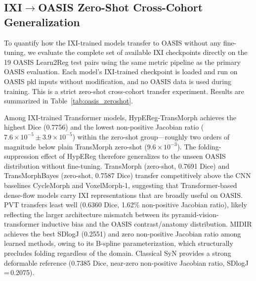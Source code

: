\documentclass[jimaging,article,submit,pdftex,moreauthors]{Definitions/mdpi}
\begin{document}
\subsection{IXI\texorpdfstring{\(\to\)}{→}OASIS Zero-Shot Cross-Cohort Generalization}\label{sec:oasis_zs}
To quantify how the IXI-trained models transfer to OASIS without any fine-tuning, we evaluate the complete set of available IXI checkpoints directly on the 19 OASIS Learn2Reg test pairs using the same metric pipeline as the primary OASIS evaluation. Each model's IXI-trained checkpoint is loaded and run on OASIS pkl inputs without modification, and no OASIS data is used during training. This is a strict zero-shot cross-cohort transfer experiment. Results are summarized in Table~\ref{tab:oasis_zeroshot}.

Among IXI-trained Transformer models, HypEReg-TransMorph achieves the highest Dice (0.7756) and the lowest non-positive Jacobian ratio (\(7.6\times10^{-5}\pm3.9\times10^{-5}\)) within the zero-shot group---roughly two orders of magnitude below plain TransMorph zero-shot (\(9.6\times10^{-3}\)). The folding-suppression effect of HypEReg therefore generalizes to the unseen OASIS distribution without fine-tuning. TransMorph (zero-shot, 0.7691 Dice) and TransMorphBayes (zero-shot, 0.7587 Dice) transfer competitively above the CNN baselines CycleMorph and VoxelMorph-1, suggesting that Transformer-based dense-flow models carry IXI representations that are broadly useful on OASIS. PVT transfers least well (0.6360 Dice, 1.62\% non-positive Jacobian ratio), likely reflecting the larger architecture mismatch between its pyramid-vision-transformer inductive bias and the OASIS contrast/anatomy distribution. MIDIR achieves the best SDlogJ (0.2551) and zero non-positive Jacobian ratio among learned methods, owing to its B-spline parameterization, which structurally precludes folding regardless of the domain. Classical SyN provides a strong deformable reference (0.7385 Dice, near-zero non-positive Jacobian ratio, SDlogJ\,=\,0.2075).
\end{document}
